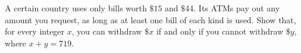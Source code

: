 A certain country uses only bills worth $\$15$ and $\$44$. Its ATMs pay out any amount you request, as long as at least one bill of each kind is used. Show that, for every integer $x$, you can withdraw $\$x$ if and only if you cannot withdraw $\$y$, where $x+y=719$.
